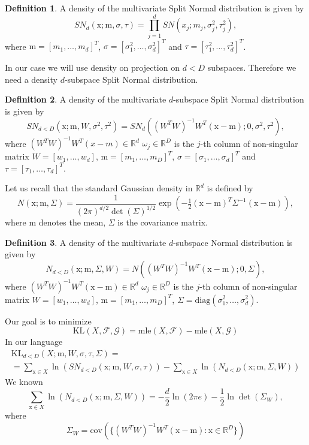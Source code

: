 \documentclass[12pt]{article}
\def\R{\mathbb{R}}
\def\w{\omega}
\def\x{\mathrm{x}}
\def\m{\mathrm{m}}
\def\F{\mathcal{F}}
\def\G{\mathcal{G}}
\def\KL{\mathrm{KL}}
\def\mle{\mathrm{mle}}
\def\diag{\mathrm{diag}}
\def\cov{\mathrm{cov}}
\theoremstyle{definition}
\newtheorem{definition}{Definition}[section]
\def\w{\omega}
\begin{document}
\begin{definition}\label{def:SN}
A density of the multivariate Split Normal distribution is given by
$$
 SN_{d}(\x; \m, \sigma,\tau)= \prod_{j=1}^{d} SN(x_j;m_j,\sigma_j^2,\tau_j^2),
$$
where  $\m = [m_1, \ldots, m_d]^T$, $\sigma = [\sigma_{1}^2,\ldots,\sigma_{d}^2]^T$ and $\tau=[\tau_{1}^2,\ldots,\tau_{d}^2]^T$.
\end{definition}


In our case we will use density on projection on $d<D$ subspaces. Therefore we need a density $d$-subspace Split Normal distribution.

\begin{definition}\label{def:GSN}
A density of the multivariate $d$-subspace Split Normal distribution is given by
$$
 SN_{d<D}(\x; \m,W, \sigma^2,\tau^2)=  SN_d((W^TW)^{-1}W^T(\x-\m);0,\sigma^2,\tau^2),
$$
where
$(W^TW)^{-1}W^T(x-m) \in \R^d$
 $\w_{j} \in \R^D$ is the $j$-th column of non-singular matrix $W = [w_{1},\ldots,w_{d}]$, $\m = [m_1, \ldots, m_D]^T$, $\sigma = [\sigma_{1},\ldots,\sigma_{d}]^T$ and $\tau=[\tau_{1},\ldots,\tau_{d}]^T$.
\end{definition}

Let us recall that the standard Gaussian density in $\R^d$ is defined by 
$$
N(\x;\m,\Sigma)=\frac{1}{(2\pi)^{d/2} \det(\Sigma)^{1/2}} \exp \left(-\tfrac{1}{2} (\x-\m)^T \Sigma^{-1}(\x-\m) \right),
$$
where $\m$ denotes the mean, $\Sigma$ is the covariance matrix.

\begin{definition}\label{def:GSN}
A density of the multivariate $d$-subspace Normal distribution is given by
$$
 N_{d<D}(\x; \m, \Sigma, W)= N((W^TW)^{-1}W^T(\x-\m);0,\Sigma),
$$
where
$(W^TW)^{-1}W^T(\x-\m) \in \R^d$
 $\w_{j} \in \R^D$ is the $j$-th column of non-singular matrix $W = [w_{1},\ldots,w_{d}]$, $\m = [m_1, \ldots, m_D]^T$, $\Sigma = \diag(\sigma_{1}^2,\ldots,\sigma_{d}^2)$.
\end{definition}

Our goal is to minimize
$$
\KL(X,\F,\G)=\mle(X,\F)-\mle(X,\G) 
$$
In our language
\begin{equation}
\begin{array}{l}
\KL_{d<D}(X;\m,W,\sigma,\tau,\Sigma) = \\[6pt]
= \sum \limits_{\x \in X} \ln(SN_{d<D}(\x;\m,W,\sigma,\tau)) -
   \sum \limits_{\x \in X} \ln(N_{d<D}(\x;\m,\Sigma,W))
\end{array}
\end{equation}
We known
$$
\sum \limits_{\x \in X} \ln(N_{d<D}(\x;\m,\Sigma,W)) = -\frac{d}{2}\ln(2\pi e)-\frac{1}{2}\ln \det(\Sigma_{W}), 
$$
where 
$$
\Sigma_{W} = \cov( \{ (W^TW)^{-1}W^T(\x-\m) \colon \x \in \R^D\} )
$$




\end{document}
